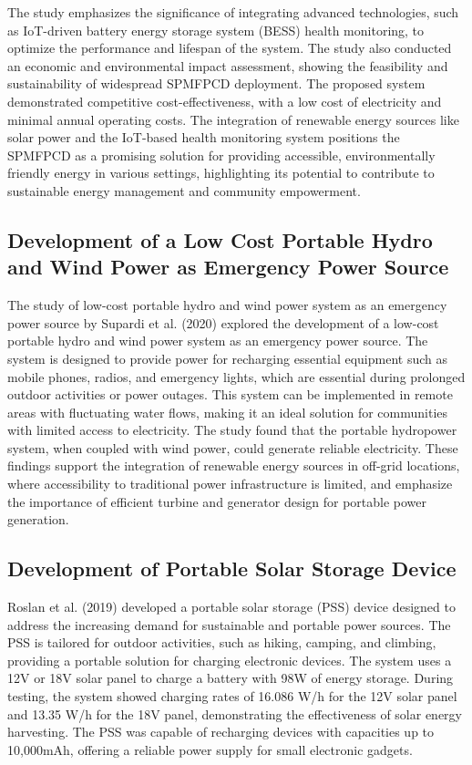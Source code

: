 {The study emphasizes the significance of integrating advanced technologies, such as IoT-driven battery energy storage system (BESS) health monitoring, to optimize the performance and lifespan of the system. The study also conducted an economic and environmental impact assessment, showing the feasibility and sustainability of widespread SPMFPCD deployment. The proposed system demonstrated competitive cost-effectiveness, with a low cost of electricity and minimal annual operating costs. The integration of renewable energy sources like solar power and the IoT-based health monitoring system positions the SPMFPCD as a promising solution for providing accessible, environmentally friendly energy in various settings, highlighting its potential to contribute to sustainable energy management and community empowerment.

\subsection{Development of a Low Cost Portable Hydro and Wind Power as Emergency Power Source}

The study of low-cost portable hydro and wind power system as an emergency power source by Supardi et al. (2020) explored the development of a low-cost portable hydro and wind power system as an emergency power source. The system is designed to provide power for recharging essential equipment such as mobile phones, radios, and emergency lights, which are essential during prolonged outdoor activities or power outages. This system can be implemented in remote areas with fluctuating water flows, making it an ideal solution for communities with limited access to electricity. The study found that the portable hydropower system, when coupled with wind power, could generate reliable electricity. These findings support the integration of renewable energy sources in off-grid locations, where accessibility to traditional power infrastructure is limited, and emphasize the importance of efficient turbine and generator design for portable power generation.

\subsection{Development of Portable Solar Storage Device}

Roslan et al. (2019) developed a portable solar storage (PSS) device designed to address the increasing demand for sustainable and portable power sources. The PSS is tailored for outdoor activities, such as hiking, camping, and climbing, providing a portable solution for charging electronic devices. The system uses a 12V or 18V solar panel to charge a battery with 98W of energy storage. During testing, the system showed charging rates of 16.086 W/h for the 12V solar panel and 13.35 W/h for the 18V panel, demonstrating the effectiveness of solar energy harvesting. The PSS was capable of recharging devices with capacities up to 10,000mAh, offering a reliable power supply for small electronic gadgets.

}
